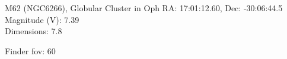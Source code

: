\begin{block}{M62 (NGC6266), Globular Cluster in Oph}
    RA: 17:01:12.60, Dec: -30:06:44.5 \\ 
    Magnitude (V): 7.39 \\ 
    Dimensions: 7.8 

    Finder fov: 60 
\end{block}